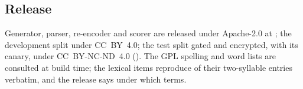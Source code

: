 \subsection{Release}
\label{sec:release}
Generator, parser, re-encoder and scorer are released under Apache-2.0 at \anonrepo{}; the development split under CC~BY~4.0; the test split gated and encrypted, with its canary, under CC~BY-NC-ND~4.0 (). The GPL spelling and word lists are consulted at build time; the lexical items reproduce  of their two-syllable entries verbatim, and the release says under which terms.
